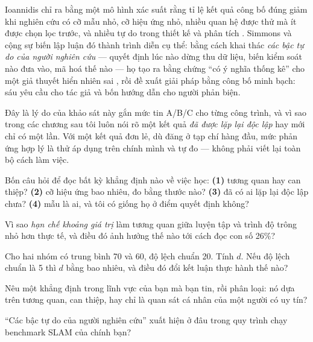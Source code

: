 \documentclass[../hieu-suat.tex]{subfiles}
\begin{document}
Ioannidis \cite{ioannidis2005} chỉ ra bằng một mô hình xác suất rằng tỉ lệ kết quả công bố đúng giảm khi nghiên cứu có cỡ mẫu nhỏ, cỡ hiệu ứng nhỏ, nhiều quan hệ được thử mà ít được chọn lọc trước, và nhiều tự do trong thiết kế và phân tích \nT{}. Simmons và cộng sự \cite{simmons2011} biến lập luận đó thành trình diễn cụ thể: bằng cách khai thác \emph{các bậc tự do của người nghiên cứu} --- quyết định lúc nào dừng thu dữ liệu, biến kiểm soát nào đưa vào, mã hoá thế nào --- họ tạo ra bằng chứng ``có ý nghĩa thống kê'' cho một giả thuyết hiển nhiên sai \nD{}, rồi đề xuất giải pháp bằng công bố minh bạch: sáu yêu cầu cho tác giả và bốn hướng dẫn cho người phản biện.

Đây là lý do  của khảo sát này gắn mức tin A/B/C cho từng công trình, và vì sao trong các chương sau tôi luôn nói rõ một kết quả \emph{đã được lặp lại độc lập} hay mới chỉ có một lần. Với một kết quả đơn lẻ, dù đăng ở tạp chí hàng đầu, mức phản ứng hợp lý là thử áp dụng trên chính mình và tự đo --- không phải viết lại toàn bộ cách làm việc.

\begin{cannho}
Bốn câu hỏi để đọc bất kỳ khẳng định nào về việc học: \textbf{(1)} tương quan hay can thiệp? \textbf{(2)} cỡ hiệu ứng bao nhiêu, đo bằng thước nào? \textbf{(3)} đã có ai lặp lại độc lập chưa? \textbf{(4)} mẫu là ai, và tôi có giống họ ở điểm quyết định không?
\end{cannho}

\begin{traloi}
\end{traloi}

\begin{tukiem}
\item Vì sao \emph{hạn chế khoảng giá trị} làm tương quan giữa luyện tập và trình độ trông nhỏ hơn thực tế, và điều đó ảnh hưởng thế nào tới cách đọc con số 26\%?
\item Cho hai nhóm có trung bình 70 và 60, độ lệch chuẩn 20. Tính \(d\). Nếu độ lệch chuẩn là 5 thì \(d\) bằng bao nhiêu, và điều đó đổi kết luận thực hành thế nào?
\item Nêu một khẳng định trong lĩnh vực của bạn mà bạn tin, rồi phân loại: nó dựa trên tương quan, can thiệp, hay chỉ là quan sát cá nhân của một người có uy tín?
\item ``Các bậc tự do của người nghiên cứu'' xuất hiện ở đâu trong quy trình chạy benchmark SLAM của chính bạn?
\end{tukiem}
\end{document}
